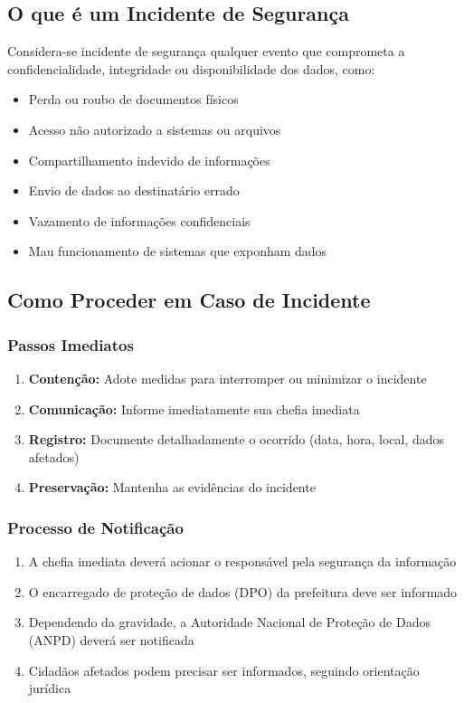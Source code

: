 \documentclass[12pt,a4paper]{article}
\begin{document}
\subsection{O que é um Incidente de Segurança}
Considera-se incidente de segurança qualquer evento que comprometa a confidencialidade, integridade ou disponibilidade dos dados, como:
\begin{itemize}
    \item Perda ou roubo de documentos físicos
    \item Acesso não autorizado a sistemas ou arquivos
    \item Compartilhamento indevido de informações
    \item Envio de dados ao destinatário errado
    \item Vazamento de informações confidenciais
    \item Mau funcionamento de sistemas que exponham dados
\end{itemize}

\subsection{Como Proceder em Caso de Incidente}

\subsubsection{Passos Imediatos}
\begin{enumerate}
    \item \textbf{Contenção:} Adote medidas para interromper ou minimizar o incidente
    \item \textbf{Comunicação:} Informe imediatamente sua chefia imediata
    \item \textbf{Registro:} Documente detalhadamente o ocorrido (data, hora, local, dados afetados)
    \item \textbf{Preservação:} Mantenha as evidências do incidente
\end{enumerate}

\subsubsection{Processo de Notificação}
\begin{enumerate}
    \item A chefia imediata deverá acionar o responsável pela segurança da informação
    \item O encarregado de proteção de dados (DPO) da prefeitura deve ser informado
    \item Dependendo da gravidade, a Autoridade Nacional de Proteção de Dados (ANPD) deverá ser notificada
    \item Cidadãos afetados podem precisar ser informados, seguindo orientação jurídica
\end{enumerate}
\end{document}
